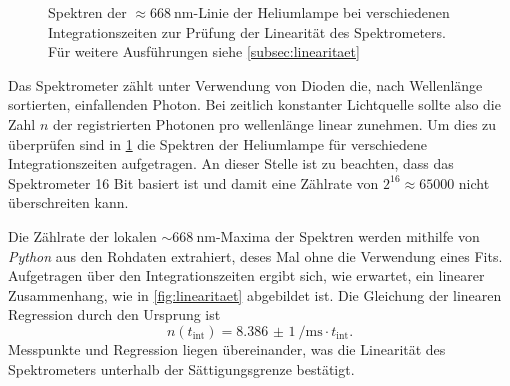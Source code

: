 \documentclass[../bericht.tex]{subfiles}
\begin{document}
\begin{figure}[tb]
          \caption[Spektren der $\sim\SI{668}{\nano\meter}$-Linie der Heliumlampe bei verschiedenen Integrationszeiten zur Prüfung der Linearität des Spektrometers.]{Spektren der $\approx\SI{668}{\nano\meter}$-Linie der Heliumlampe bei verschiedenen Integrationszeiten zur Prüfung der Linearität des Spektrometers. Für weitere Ausführungen siehe \cref{subsec:linearitaet}}
          \label{fig:linearity}
        \end{figure}

        Das Spektrometer zählt unter Verwendung von Dioden die, nach Wellenlänge sortierten, einfallenden Photon. Bei zeitlich konstanter Lichtquelle sollte also die Zahl $n$ der registrierten Photonen pro wellenlänge linear zunehmen. Um dies zu überprüfen sind in \cref{fig:linearity} die Spektren der Heliumlampe für verschiedene Integrationszeiten aufgetragen. An dieser Stelle ist zu beachten, dass das Spektrometer 16 Bit basiert ist und damit eine Zählrate von $2^{16}\approx 65000$ nicht überschreiten kann.

        Die Zählrate der lokalen $\sim\SI{668}{\nano\meter}$-Maxima der Spektren werden mithilfe von \textit{Python} aus den Rohdaten extrahiert, deses Mal ohne die Verwendung eines Fits. Aufgetragen über den Integrationszeiten ergibt sich, wie erwartet, ein linearer Zusammenhang, wie in \cref{fig:linearitaet} abgebildet ist. Die Gleichung der linearen Regression durch den Ursprung ist
        \begin{equation}
          n(t_\mathrm{int})=\SI{8,386(1)}{\per\milli\second} \cdot t_\mathrm{int}.
          \label{eq:linear-fit}
        \end{equation}
        Messpunkte und Regression liegen übereinander, was die Linearität des Spektrometers unterhalb der Sättigungsgrenze bestätigt.
\end{document}
